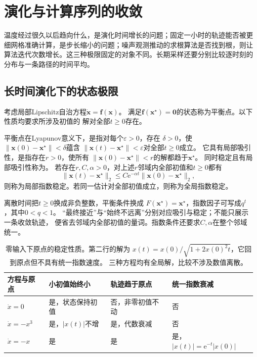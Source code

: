 \section{演化与计算序列的收敛}
\label{sec:action-state-convergence}
温度经过很久以后趋向什么，是演化时间增长的问题；固定一小时的轨迹能否被更细网格准确计算，是步长缩小的问题；噪声观测推动的求根算法是否找到根，则让算法迭代次数增长。这三种极限固定的对象不同。长期采样还要分别比较逐时刻的分布与一条路径的时间平均。

\subsection{长时间演化下的状态极限}
\begin{definition}[平衡点与稳定性]
  \label{def:dynamical-equilibrium-stability}
  考虑局部Lipschitz自治方程$\dot{\bm x}=\bm f(\bm x)$。
  满足$\bm f(\bm x^\star)=\bm0$的状态称为平衡点。以下性质均要求所涉及初值的
  解对全部$t\geq0$存在。

  平衡点在Lyapunov意义下，是指对每个$\varepsilon>0$，存在
  $\delta>0$，使$\|\bm x(0)-\bm x^\star\|<\delta$蕴含
  $\|\bm x(t)-\bm x^\star\|<\varepsilon$对全部$t\geq0$成立。
  它具有局部吸引性，是指存在$r>0$，使所有
  $\|\bm x(0)-\bm x^\star\|<r$的解都趋于$\bm x^\star$。
  同时稳定且有局部吸引性称为。
  若存在$r,C,\alpha>0$，对上述$r$邻域内全部初值和$t\geq0$都有
  \[
    \|\bm x(t)-\bm x^\star\|_2
    \leq C\mathrm e^{-\alpha t}\|\bm x(0)-\bm x^\star\|_2,
  \]
  则称为局部指数稳定。若同一估计对全部初值成立，则称为全局指数稳定。
\end{definition}
离散时间把$t\geq0$换成非负整数，平衡条件换成
$F(\bm x^\star)=\bm x^\star$，指数因子可写成$q^t$，其中$0<q<1$。
“最终接近”与“始终不远离”分别对应吸引与稳定；不能只展示一条收敛轨迹，
便省去邻域内全部初值的量词。指数条件还要求$C,\alpha$在整个邻域统一。

\begin{table}[htbp]
  \centering
  \begin{tabularx}{\linewidth}{lXXX}
    \toprule
    方程与原点 & 小初值始终小 & 轨迹趋于原点 & 统一指数衰减\\
    \midrule
    $\dot x=0$ & 是，状态保持初值 & 否，非零初值不动 & 否\\
    $\dot x=-x^3$ & 是，$|x(t)|$不增 & 是，代数衰减 & 否\\
    $\dot x=-x$ & 是 & 是 & 是，$|x(t)|=\mathrm e^{-t}|x(0)|$\\
    \bottomrule
  \end{tabularx}
  \caption{零输入下原点的稳定性质。第二行的解为
  $x(t)=x(0)/\sqrt{1+2x(0)^2t}$，它回到原点但不具有统一指数速度。
  三种方程均有全局解，比较不涉及数值离散。}
  \label{tab:dynamical-stability-types}
\end{table}

